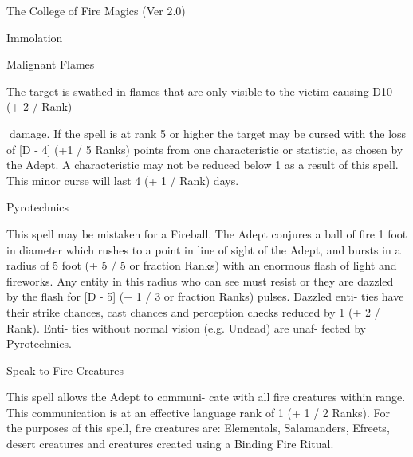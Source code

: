 \begin{Chapter}{The College of Fire Magics (Ver 2.0)}
\begin{spell}[S-7]{Immolation }
\begin{effects}
\end{effects}
\end{spell}

\begin{spell}[S-8]{Malignant Flames }

\begin{effects}
 The  target  is  swathed  in  flames  that  are 
only visible to the victim causing D10 (+ 2 / Rank) 

damage. If the spell is at rank 5 or higher the target 
may  be  cursed  with  the  loss  of  [D  -  4]  (+1  /  5 
Ranks)  points  from  one  characteristic  or  statistic, 
as  chosen  by  the  Adept.  A  characteristic  may  not 
be  reduced  below  1  as  a  result  of  this  spell.  This 
minor curse will last 4 (+ 1 / Rank) days. 

\end{effects}
\end{spell}

\begin{spell}[S-9]{Pyrotechnics }

\begin{effects}
 This  spell  may  be  mistaken for  a  Fireball. 
The Adept conjures a ball of fire 1 foot in diameter 
which  rushes  to  a  point  in  line  of  sight  of  the 
Adept,  and  bursts in a  radius  of  5  foot  (+  5  /  5  or 
fraction Ranks) with an enormous flash of light and 
fireworks.  Any  entity  in  this  radius  who  can  see 
must resist or they are dazzled by the flash for [D - 
5] (+ 1 / 3 or fraction Ranks) pulses. Dazzled enti-
ties  have  their  strike  chances,  cast  chances  and 
perception checks reduced by 1 (+ 2 / Rank). Enti-
ties  without normal  vision  (e.g.  Undead)  are  unaf-
fected by Pyrotechnics. 

\end{effects}
\end{spell}

\begin{spell}[S-10]{Speak to Fire Creatures }

\begin{effects}
 This  spell  allows  the  Adept  to  communi-
cate  with  all  fire  creatures  within  range.  This 
communication is  at an  effective  language  rank  of 
1  (+  1  /  2  Ranks).  For  the  purposes  of  this  spell, 
fire  creatures  are:  Elementals,  Salamanders, 
Efreets,  desert  creatures  and  creatures  created 
using a Binding Fire Ritual. 


\end{effects}
\end{spell}
\end{Chapter}
